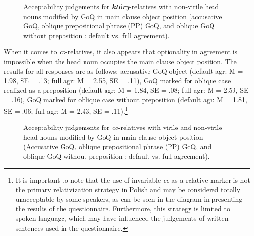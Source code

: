 \documentclass[output=paper]{langsci/langscibook}
\begin{document}
\begin{styleListParagraph}
  
 
\end{styleListParagraph}

\begin{styleListParagraph}\begin{figure}
\caption{Acceptability judgements for \textbf{\textit{który}}{}-relatives with non-virile head nouns modified by GoQ in main clause object position (accusative GoQ, oblique prepositional phrase (PP) GoQ, and oblique GoQ without preposition : default vs. full agreement).}
\label{fig:key:1}
\end{figure}\end{styleListParagraph}

\begin{styleListParagraph}
When it comes to \textit{co}{}-relatives, it also appears that optionality in agreement is impossible when the head noun occupies the main clause object position. The results for all responses are as follows: accusative GoQ object (default agr: M = 1.98, SE = .13; full agr: M = 2.55, SE = .11), GoQ marked for oblique case realized as a preposition (default agr: M = 1.84, SE = .08; full agr: M = 2.59, SE = .16), GoQ marked for oblique case without preposition (default agr: M = 1.81, SE = .06; full agr: M = 2.43, SE = .11).\footnote{It is important to note that the use of invariable \textit{co} as a relative marker is not the primary relativization strategy in Polish and may be considered totally unacceptable by some speakers, as can be seen in the diagram in  presenting the results of the questionnaire. Furthermore, this strategy is limited to spoken language, which may have influenced the judgements of written sentences used in the questionnaire.} 
\end{styleListParagraph}

\begin{styleListParagraph}
  
 
\end{styleListParagraph}

\begin{styleListParagraph}\begin{figure}
\caption{Acceptability judgements for \textit{co}{}-relatives with virile and non-virile head nouns modified by GoQ in main clause object position (Accusative GoQ, oblique prepositional phrase (PP) GoQ, and oblique GoQ without preposition : default vs. full agreement).}
\label{fig:key:2}
\end{figure}\end{styleListParagraph}
\end{document}
